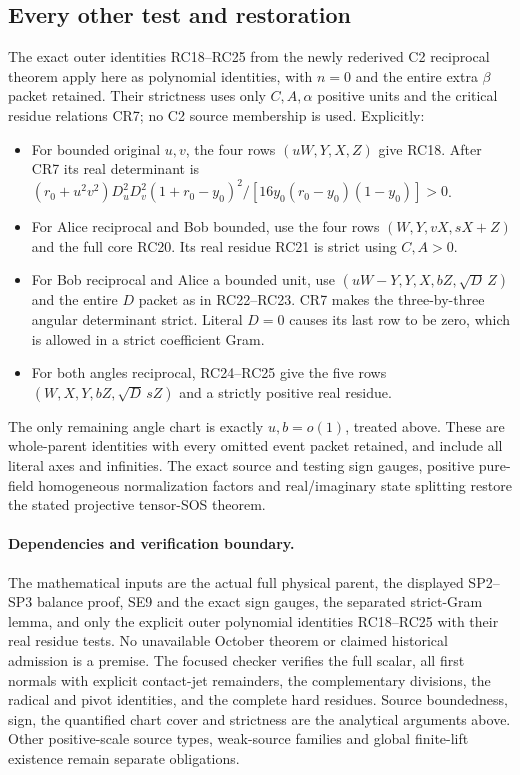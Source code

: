 \subsection{Every other test and restoration}

The exact outer identities RC18--RC25 from the newly rederived
C2 reciprocal theorem apply here as polynomial identities, with
$n=0$ and the entire extra $\beta$ packet retained. Their strictness
uses only $C,A,\alpha$ positive units and the critical residue
relations CR7; no C2 source membership is used. Explicitly:
\begin{itemize}
\item For bounded original $u,v$, the four rows $(uW,Y,X,Z)$
give RC18. After CR7 its real determinant is
$ (r_0+u^2v^2)D_u^2D_v^2(1+r_0-y_0)^2/
[16y_0(r_0-y_0)(1-y_0)]>0$.
\item For Alice reciprocal and Bob bounded, use the four rows
$(W,Y,vX,sX+Z)$ and the full core RC20. Its real residue RC21
is strict using $C,A>0$.
\item For Bob reciprocal and Alice a bounded unit, use
$(uW-Y,Y,X,bZ,\sqrt D\,Z)$ and the entire $D$ packet as in
RC22--RC23. CR7 makes the three-by-three angular determinant
strict. Literal $D=0$ causes its last row to be zero, which is
allowed in a strict coefficient Gram.
\item For both angles reciprocal, RC24--RC25 give the five rows
$(W,X,Y,bZ,\sqrt D\,sZ)$ and a strictly positive real residue.
\end{itemize}
The only remaining angle chart is exactly $u,b=o(1)$, treated
above. These are whole-parent identities with every omitted event
packet retained, and include all literal axes and infinities.
The exact source and testing sign gauges, positive pure-field
homogeneous normalization factors and real/imaginary state splitting
restore the stated projective tensor-SOS theorem.

\paragraph{Dependencies and verification boundary.}
The mathematical inputs are the actual full physical parent, the
displayed SP2--SP3 balance proof, SE9 and the exact sign gauges,
the separated strict-Gram lemma, and only the explicit outer
polynomial identities RC18--RC25 with their real residue tests.
No unavailable October theorem or claimed historical admission is
a premise. The focused checker verifies the full scalar, all first
normals with explicit contact-jet remainders, the complementary
divisions, the radical and pivot identities, and the complete hard
residues. Source boundedness, sign, the quantified chart cover and
strictness are the analytical arguments above. Other positive-scale
source types, weak-source families and global finite-lift existence
remain separate obligations.
